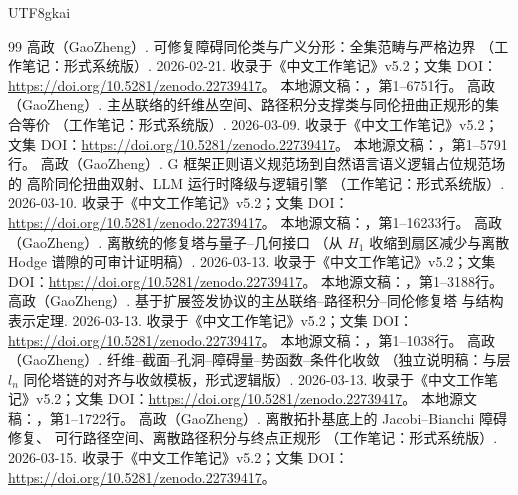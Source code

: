 \documentclass[11pt,a4paper]{article}
\theoremstyle{plain}
\theoremstyle{definition}
\theoremstyle{remark}
\begin{document}
\begin{CJK*}{UTF8}{gkai}
\begin{thebibliography}{99}
高政（GaoZheng）. 可修复障碍同伦类与广义分形：全集范畴与严格边界 （工作笔记：形式系统版）. 2026-02-21.
\newblock 收录于《中文工作笔记》v5.2；文集 DOI：\url{https://doi.org/10.5281/zenodo.22739417}。
\newblock 本地源文稿：，第1--6751行。
高政（GaoZheng）. 主丛联络的纤维丛空间、路径积分支撑类与同伦扭曲正规形的集合等价 （工作笔记：形式系统版）. 2026-03-09.
\newblock 收录于《中文工作笔记》v5.2；文集 DOI：\url{https://doi.org/10.5281/zenodo.22739417}。
\newblock 本地源文稿：，第1--5791行。
高政（GaoZheng）. G 框架正则语义规范场到自然语言语义逻辑占位规范场的 高阶同伦扭曲双射、LLM 运行时降级与逻辑引擎 （工作笔记：形式系统版）. 2026-03-10.
\newblock 收录于《中文工作笔记》v5.2；文集 DOI：\url{https://doi.org/10.5281/zenodo.22739417}。
\newblock 本地源文稿：，第1--16233行。
高政（GaoZheng）. 离散统的修复塔与量子--几何接口 （从 $H_1$ 收缩到扇区减少与离散 Hodge 谱隙的可审计证明稿）. 2026-03-13.
\newblock 收录于《中文工作笔记》v5.2；文集 DOI：\url{https://doi.org/10.5281/zenodo.22739417}。
\newblock 本地源文稿：，第1--3188行。
高政（GaoZheng）. 基于扩展签发协议的主丛联络--路径积分--同伦修复塔 与结构表示定理. 2026-03-13.
\newblock 收录于《中文工作笔记》v5.2；文集 DOI：\url{https://doi.org/10.5281/zenodo.22739417}。
\newblock 本地源文稿：，第1--1038行。
高政（GaoZheng）. 纤维--截面--孔洞--障碍量--势函数--条件化收敛 （独立说明稿：与层 $l_n$ 同伦塔链的对齐与收敛模板，形式逻辑版）. 2026-03-13.
\newblock 收录于《中文工作笔记》v5.2；文集 DOI：\url{https://doi.org/10.5281/zenodo.22739417}。
\newblock 本地源文稿：，第1--1722行。
高政（GaoZheng）. 离散拓扑基底上的 Jacobi--Bianchi 障碍修复、 可行路径空间、离散路径积分与终点正规形 （工作笔记：形式系统版）. 2026-03-15.
\newblock 收录于《中文工作笔记》v5.2；文集 DOI：\url{https://doi.org/10.5281/zenodo.22739417}。

\end{thebibliography}
\end{CJK*}
\end{document}
